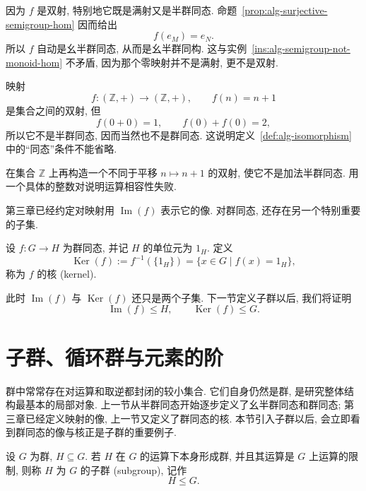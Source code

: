 \documentclass[usesamecnt, thmcnt=section, lang=cn, newtx, 10pt, scheme=chinese]{elegantbook}
\begin{document}
\begin{solution}
因为 $f$ 是双射, 特别地它既是满射又是半群同态. 命题~\ref{prop:alg-surjective-semigroup-hom} 因而给出
\[
 f(e_M)=e_N.
\]
所以 $f$ 自动是幺半群同态, 从而是幺半群同构. 这与实例~\ref{ins:alg-semigroup-not-monoid-hom} 不矛盾, 因为那个零映射并不是满射, 更不是双射.
\end{solution}

\begin{instance}
映射
\[
 f:(\mathbb Z,+)\to(\mathbb Z,+),\qquad f(n)=n+1
\]
是集合之间的双射, 但
\[
 f(0+0)=1,
 \qquad
 f(0)+f(0)=2,
\]
所以它不是半群同态, 因而当然也不是群同态. 这说明定义~\ref{def:alg-isomorphism} 中的``同态''条件不能省略.
\end{instance}

\begin{exercise}\label{ex:alg-bij-not-iso}
在集合 $\mathbb Z$ 上再构造一个不同于平移 $n\mapsto n+1$ 的双射, 使它不是加法半群同态. 用一个具体的整数对说明运算相容性失败.
\end{exercise}

第三章已经约定对映射用 $\operatorname{Im}(f)$ 表示它的像. 对群同态, 还存在另一个特别重要的子集.

\begin{definition}[群同态的核]\label{def:alg-group-kernel}
设 $f:G\to H$ 为群同态, 并记 $H$ 的单位元为 $1_H$. 定义
\[
 \operatorname{Ker}(f):=
 f^{-1}(\{1_H\})
 =
 \{x\in G\mid f(x)=1_H\},
\]
称为 $f$ 的{\color{blue}核 (kernel)}.
\end{definition}

此时 $\operatorname{Im}(f)$ 与 $\operatorname{Ker}(f)$ 还只是两个子集. 下一节定义子群以后, 我们将证明
\[
 \operatorname{Im}(f)\leq H,
 \qquad
 \operatorname{Ker}(f)\leq G.
\]

\section{子群、循环群与元素的阶}

群中常常存在对运算和取逆都封闭的较小集合. 它们自身仍然是群, 是研究整体结构最基本的局部对象. 上一节从半群同态开始逐步定义了幺半群同态和群同态; 第三章已经定义映射的像, 上一节又定义了群同态的核. 本节引入子群以后, 会立即看到群同态的像与核正是子群的重要例子.

\begin{definition}[子群]\label{def:alg-subgroup}
设 $G$ 为群, $H\subseteq G$. 若 $H$ 在 $G$ 的运算下本身形成群, 并且其运算是 $G$ 上运算的限制, 则称 $H$ 为 $G$ 的{\color{blue}子群 (subgroup)}, 记作
\[
 H\leq G.
\]
\end{definition}
\end{document}

